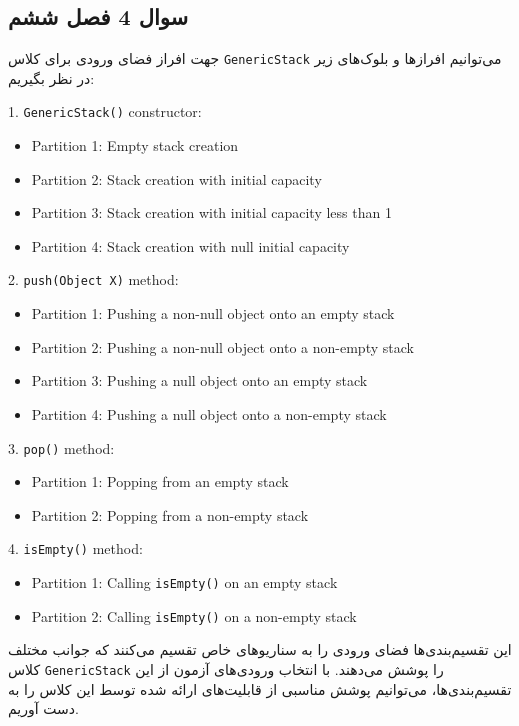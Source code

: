 \documentclass{article}
\begin{document}
\subsection{سوال 4 فصل ششم}
جهت افراز فضای ورودی برای کلاس \texttt{GenericStack} می‌توانیم ‌افرازها و بلوک‌های زیر در نظر بگیریم:
\begin{latin}
1. \texttt{GenericStack()} constructor:
   \begin{itemize}
   \item Partition 1: Empty stack creation
   \item Partition 2: Stack creation with initial capacity
   \item Partition 3: Stack creation with initial capacity less than 1
   \item Partition 4: Stack creation with null initial capacity
   \end{itemize}
2. \texttt{push(Object X)} method:
   \begin{itemize}
   \item Partition 1: Pushing a non-null object onto an empty stack
   \item Partition 2: Pushing a non-null object onto a non-empty stack
   \item Partition 3: Pushing a null object onto an empty stack
   \item Partition 4: Pushing a null object onto a non-empty stack
   \end{itemize}
3. \texttt{pop()} method:
   \begin{itemize}
   \item Partition 1: Popping from an empty stack
   \item Partition 2: Popping from a non-empty stack
   \end{itemize}
4. \texttt{isEmpty()} method:
   \begin{itemize}
   \item Partition 1: Calling \texttt{isEmpty()} on an empty stack
   \item Partition 2: Calling \texttt{isEmpty()} on a non-empty stack
   \end{itemize}
\end{latin}
این تقسیم‌بندی‌ها فضای ورودی را به سناریوهای خاص تقسیم می‌کنند که جوانب مختلف کلاس \texttt{GenericStack} را پوشش می‌دهند. با انتخاب ورودی‌های آزمون از این تقسیم‌بندی‌ها، می‌توانیم پوشش مناسبی از قابلیت‌های ارائه شده توسط این کلاس را به دست آوریم.
\end{document}
